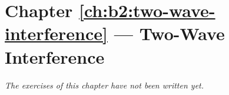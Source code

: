 \section*{Chapter \ref{ch:b2:two-wave-interference} --- Two-Wave Interference}


\emph{The exercises of this chapter have not been written yet.}
